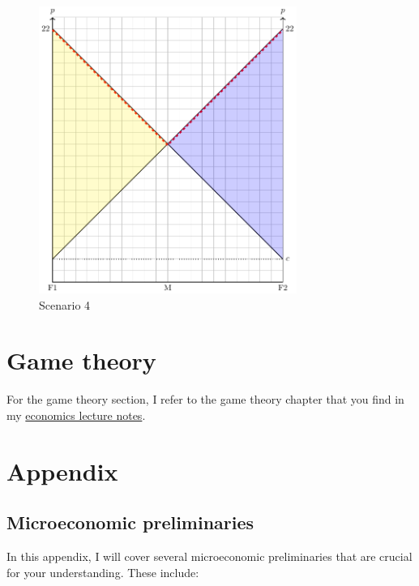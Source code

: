 \documentclass[
  12pt,
  oneside]{book}
\theoremstyle{definition}
\theoremstyle{definition}
\theoremstyle{definition}
\theoremstyle{definition}
\theoremstyle{remark}
\begin{document}
\begin{figure}
\centering
\includegraphics[width=0.75\textwidth,height=\textheight]{fig/lau4.png}
\caption{\label{fig:lau4} Scenario 4}
\end{figure}

\chapter{Game theory}\label{game-theory}

For the game theory section, I refer to the game theory chapter that you find in my \href{https://raw.githubusercontent.com/hubchev/courses/main/pdfs/econ_a4.pdf}{economics lecture notes}.

\chapter{Appendix}\label{appendix}

\section{Microeconomic preliminaries}\label{micro-pre}

In this appendix, I will cover several microeconomic preliminaries that are crucial for your understanding. These include:
\end{document}
